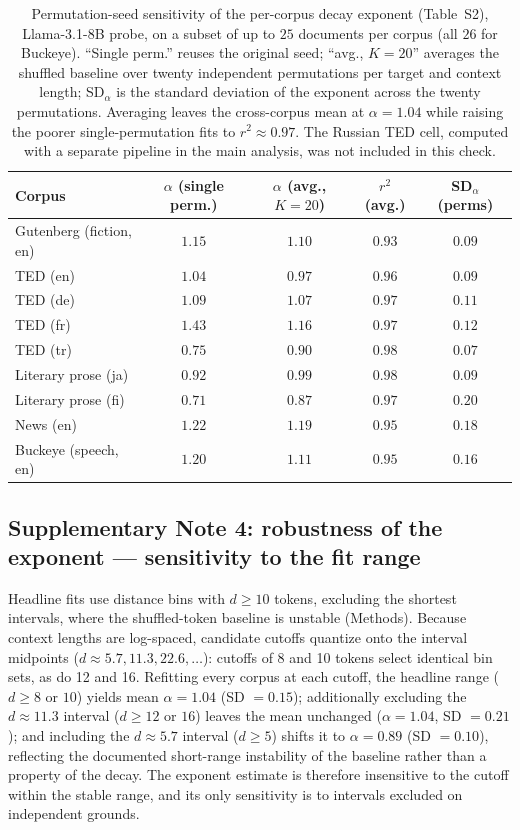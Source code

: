 \documentclass[11pt]{article}
\begin{document}
\renewcommand{\thetable}{S2}
\begin{table}[h]
\centering
\small
\begin{tabular}{lcccc}
\toprule
Corpus & $\alpha$ (single perm.) & $\alpha$ (avg., $K=20$) & $r^2$ (avg.) & SD$_\alpha$ (perms) \\
\midrule
Gutenberg (fiction, en) & $1.15$ & $1.10$ & $0.93$ & $0.09$ \\
TED (en)                & $1.04$ & $0.97$ & $0.96$ & $0.09$ \\
TED (de)                & $1.09$ & $1.07$ & $0.97$ & $0.11$ \\
TED (fr)                & $1.43$ & $1.16$ & $0.97$ & $0.12$ \\
TED (tr)                & $0.75$ & $0.90$ & $0.98$ & $0.07$ \\
Literary prose (ja)     & $0.92$ & $0.99$ & $0.98$ & $0.09$ \\
Literary prose (fi)     & $0.71$ & $0.87$ & $0.97$ & $0.20$ \\
News (en)               & $1.22$ & $1.19$ & $0.95$ & $0.18$ \\
Buckeye (speech, en)    & $1.20$ & $1.11$ & $0.95$ & $0.16$ \\
\bottomrule
\end{tabular}
\caption{Permutation-seed sensitivity of the per-corpus decay exponent (Table~S2), Llama-3.1-8B
probe, on a subset of up to $25$ documents per corpus (all $26$ for Buckeye). ``Single perm.'' reuses
the original seed; ``avg., $K=20$'' averages the shuffled baseline over twenty independent
permutations per target and context length; SD$_\alpha$ is the standard deviation of the exponent
across the twenty permutations. Averaging leaves the cross-corpus mean at $\alpha=1.04$ while raising
the poorer single-permutation fits to $r^2\approx0.97$. The Russian TED cell, computed with a
separate pipeline in the main analysis, was not included in this check.}
\end{table}

\subsection*{Supplementary Note 4: robustness of the exponent --- sensitivity to the fit range}

Headline fits use distance bins with $d \geq 10$ tokens, excluding the shortest intervals, where
the shuffled-token baseline is unstable (Methods). Because context lengths are log-spaced,
candidate cutoffs quantize onto the interval midpoints ($d \approx 5.7, 11.3, 22.6, \ldots$):
cutoffs of 8 and 10 tokens select identical bin sets, as do 12 and 16. Refitting every corpus at
each cutoff, the headline range ($d \geq 8$ or $10$) yields mean $\alpha = 1.04$ (SD $= 0.15$);
additionally excluding the $d \approx 11.3$ interval ($d \geq 12$ or $16$) leaves the mean
unchanged ($\alpha = 1.04$, SD $= 0.21$); and including the $d \approx 5.7$ interval
($d \geq 5$) shifts it to $\alpha = 0.89$ (SD $= 0.10$), reflecting the documented short-range
instability of the baseline rather than a property of the decay. The exponent estimate is
therefore insensitive to the cutoff within the stable range, and its only sensitivity is to
intervals excluded on independent grounds.
\end{document}
